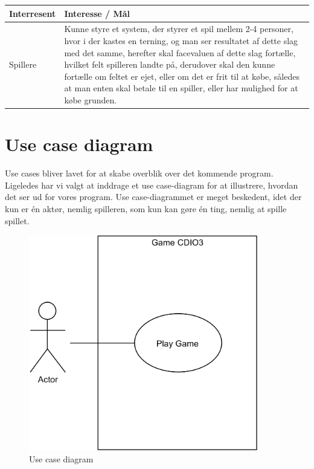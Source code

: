     \begin{tabular}{ | l | p{13cm} |}
      
      \hline
    \textbf{Interresent} & \textbf{Interesse / Mål} \\ \hline
    Spillere & Kunne styre et system, der styrer et spil mellem 2-4 personer, 
    hvor i der kastes en terning, og man ser resultatet af dette slag med det samme, herefter skal facevaluen af dette slag fortælle, hvilket felt spilleren landte på, derudover skal den kunne fortælle om feltet er ejet, eller om det er frit til at købe, således at man enten skal betale til en spiller, eller har mulighed for at købe grunden.
    \\ 
    \hline
      
    \hline
    \end{tabular}

\section{Use case diagram}
Use cases bliver lavet for at skabe overblik over det kommende program.
Ligeledes har vi valgt at inddrage et use case-diagram for at illustrere, hvordan det ser ud for vores program.
Use case-diagrammet er meget beskedent, idet der kun er én aktør, nemlig spilleren, som kun kan gøre én ting, nemlig at spille spillet.
\begin{figure}[H]
    \begin{center}
        \includegraphics[width=10cm]{graphics/usecases/UseCase1.png}
        \caption{Use case diagram}
        \label{fig:use_case_diagram}
    \end{center}
\end{figure}

